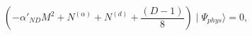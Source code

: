 \begin{equation}
(-\alpha'_{ND}M^{2}+N^{(\alpha)}+N^{(d)}+
\frac{(D-1)}{8})\mid\Psi_{phys}\rangle=0,
\end{equation}

